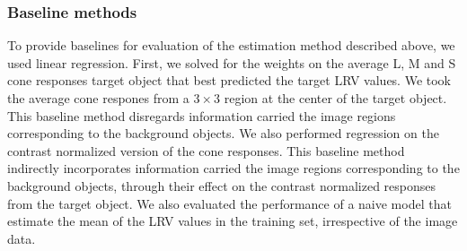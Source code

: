 \documentclass{jov}
\begin{document}
\subsubsection*{Baseline methods}

To provide baselines for evaluation of the estimation method described above, we used linear regression.
First, we solved for the weights on the average L, M and S cone responses target object that best predicted the target LRV values.
We took the average cone respones from a $3 \times 3$ region at the center of the target object.
This baseline method disregards information carried the image regions corresponding to the background objects.
We also performed regression on the contrast normalized version of the cone responses.
This baseline method indirectly incorporates information carried the image regions corresponding to the background objects,
through their effect on the contrast normalized responses from the target object. 
We also evaluated the performance of a naive model that estimate the mean of the LRV values in the training set, irrespective
of the image data.
\end{document}
